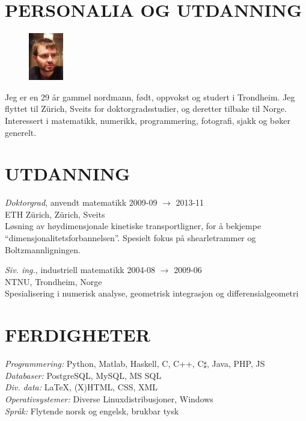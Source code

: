 \documentclass[line,margin]{res}
\newcommand{\zh}{Z\"{u}rich}
\begin{document}
\address{Høgreina 394, NO-7079 Flatåsen}
\address{+41 78 634 68 37, evfonn@gmail.com}


\begin{resume}

\section{PERSONALIA OG UTDANNING}

\begin{figure}
  \vspace{-0.6cm}
  \includegraphics[width=1.5cm]{photo.png}
\end{figure}

Jeg er en 29 år gammel nordmann, født, oppvokst og studert i Trondheim. Jeg flyttet til \zh, Sveits
for doktorgradsstudier, og deretter tilbake til Norge. Interessert i matematikk, numerikk,
programmering, fotografi, sjakk og bøker generelt.


\section{UTDANNING} 

{\em Doktorgrad}, anvendt matematikk \hfill 2009-09 $\to$ 2013-11 \\
ETH \zh, \zh, Sveits \\
Løsning av høydimensjonale kinetiske transportligner, for å bekjempe
``dimensjonalitetsforbannelsen''. Spesielt fokus på shearlet\-rammer og Boltzmann\-ligningen.

{\em Siv. ing.}, industriell matematikk \hfill 2004-08 $\to$ 2009-06 \\
NTNU, Trondheim, Norge \\
Spesialisering i numerisk analyse, geometrisk integrasjon og differensialgeometri


\section{FERDIGHETER}

{\em Programmering:} Python, Matlab, Haskell, C, C++, C$\sharp$, Java, PHP, JS \\
{\em Databaser:} PostgreSQL, MySQL, MS SQL \\
{\em Div. data:} \LaTeX, (X)HTML, CSS, XML \\
{\em Operativsystemer:} Diverse Linuxdistribusjoner, Windows \\
{\em Språk:} Flytende norsk og engelsk, brukbar tysk



\end{resume}
\end{document}
